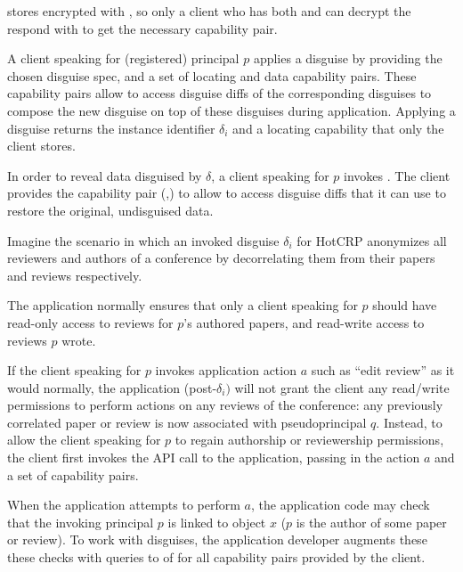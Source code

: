 \sys stores  encrypted with , so only a client who has both
 and  can decrypt the respond with  to get the necessary
 capability pair. 

A client speaking for (registered) principal $p$ applies a disguise by providing the chosen disguise
spec, and a set of locating and data capability pairs. These capability pairs allow \sys to access
disguise diffs of the corresponding disguises to compose the new disguise on top of these disguises
during application. Applying a disguise returns the instance identifier $\delta_i$ and a locating
capability  that only the client stores. 

In order to reveal data disguised by $\delta$, a client speaking for $p$ invokes
.  The client provides the capability pair (,)
to allow \sys to access disguise diffs that it can use to restore the original, undisguised data.

Imagine the scenario in which an invoked disguise $\delta_i$ for HotCRP anonymizes all reviewers and
authors of a conference by decorrelating them from their papers and reviews respectively.

The application normally ensures that only a client speaking for $p$ should have read-only access to
reviews for $p$'s authored papers, and read-write access to reviews $p$ wrote.

If the client speaking for $p$ invokes application action $a$ such as ``edit review'' as it would
normally, the application
(post-$\delta_i)$ will not grant the client any read/write permissions to perform actions on 
any reviews of the conference: any previously correlated paper or review is now associated with
pseudoprincipal $q$.
Instead, to allow the client speaking for $p$ to regain authorship or reviewership permissions, the client first invokes the
 API call to the application, passing in the action $a$ and a set of
capability pairs.  

When the application attempts to perform $a$, the application code may check that the invoking
principal $p$ is linked to object $x$ (\eg $p$ is the author of some paper or review). To work with
disguises, the application developer augments these these checks with queries to \sys of
 for all capability pairs provided by the
client.

